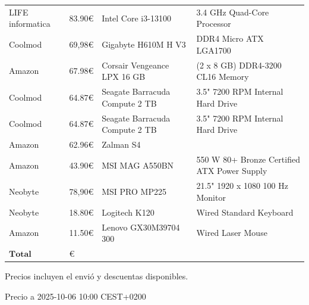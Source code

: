 \documentclass[spanish,openany]{report}
\begin{document}
\begin{tabularx}{\linewidth}{|C{2.5cm}|Y|Y|Y|}
\hline
{} &  &  &  \\
\hline
LIFE informatica &83.90\euro  &Intel Core i3-13100 & 3.4 $\si{\giga\hertz}$  Quad-Core Processor \\
\hline
Coolmod & 69,98\euro & Gigabyte H610M H V3 & DDR4 Micro ATX LGA1700\\
\hline
Amazon & 67.98\euro & Corsair Vengeance LPX 16 GB & (2 x 8 GB) DDR4-3200 CL16 Memory\\
\hline
Coolmod&64.87\euro & Seagate Barracuda Compute 2 TB  & 3.5" 7200 RPM Internal Hard Drive\\
\hline
Coolmod&64.87\euro & Seagate Barracuda Compute 2 TB  & 3.5" 7200 RPM Internal Hard Drive\\
\hline
Amazon &  62.96\euro & Zalman S4 & \\
\hline
Amazon & 43.90\euro & MSI MAG A550BN & 550 W 80+ Bronze Certified ATX Power Supply\\
\hline
Neobyte & 78,90\euro & MSI PRO MP225 & 21.5" 1920 x 1080 100 Hz Monitor\\
\hline
Neobyte & 18.80\euro & Logitech K120&  Wired Standard Keyboard \\
\hline
Amazon & 11.50\euro  & Lenovo GX30M39704 300 & Wired Laser Mouse\\
\hline
\large{$\mathbf{Total}$} &    \\  %
 \hline
\end{tabularx}
Precios incluyen el envió y descuentas disponibles.

Precio a 2025-10-06 10:00 CEST+0200
\clearpage
{}
\end{document}
